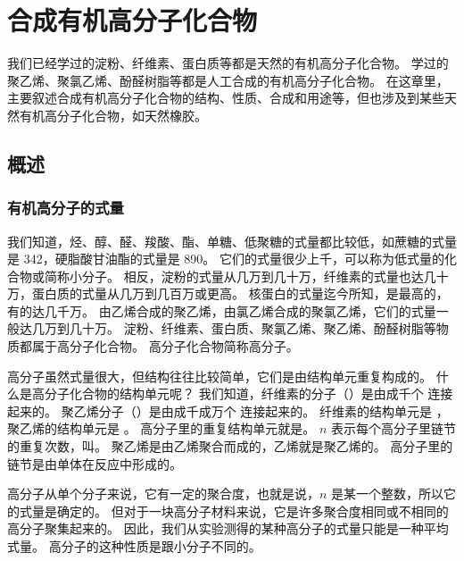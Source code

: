 \chapter{合成有机高分子化合物}
我们已经学过的淀粉、纤维素、蛋白质等都是天然的有机高分子化合物。
学过的聚乙烯、聚氯乙烯、酚醛树脂等都是人工合成的有机高分子化合物。
在这章里，主要叙述合成有机高分子化合物的结构、性质、合成和用途等，但也涉及到某些天然有机高分子化合物，如天然橡胶。

\section{概述}
\subsection{有机高分子的式量}
我们知道，烃、醇、醛、羧酸、酯、单糖、低聚糖的式量都比较低，如蔗糖的式量是 342，硬脂酸甘油酯的式量是 890。
它们的式量很少上千，可以称为低式量的化合物或简称小分子。
相反，淀粉的式量从几万到几十万，纤维素的式量也达几十万，蛋白质的式量从几万到几百万或更高。
核蛋白的式量迄今所知，是最高的，有的达几千万。
由乙烯合成的聚乙烯，由氯乙烯合成的聚氯乙烯，它们的式量一般达几万到几十万。
淀粉、纤维素、蛋白质、聚氯乙烯、聚乙烯、酚醛树脂等物质都属于高分子化合物。
高分子化合物简称高分子。

高分子虽然式量很大，但结构往往比较简单，它们是由结构单元重复构成的。
什么是高分子化合物的结构单元呢？
我们知道，纤维素的分子（）是由成千个  连接起来的。
聚乙烯分子（）是由成千成万个  连接起来的。
纤维素的结构单元是 ，聚乙烯的结构单元是 。
高分子里的重复结构单元就是。
$n$ 表示每个高分子里链节的重复次数，叫。
聚乙烯是由乙烯聚合而成的，乙烯就是聚乙烯的。
高分子里的链节是由单体在反应中形成的。

高分子从单个分子来说，它有一定的聚合度，也就是说，$n$ 是某一个整数，所以它的式量是确定的。
但对于一块高分子材料来说，它是许多聚合度相同或不相同的高分子聚集起来的。
因此，我们从实验测得的某种高分子的式量只能是一种平均式量。
高分子的这种性质是跟小分子不同的。


